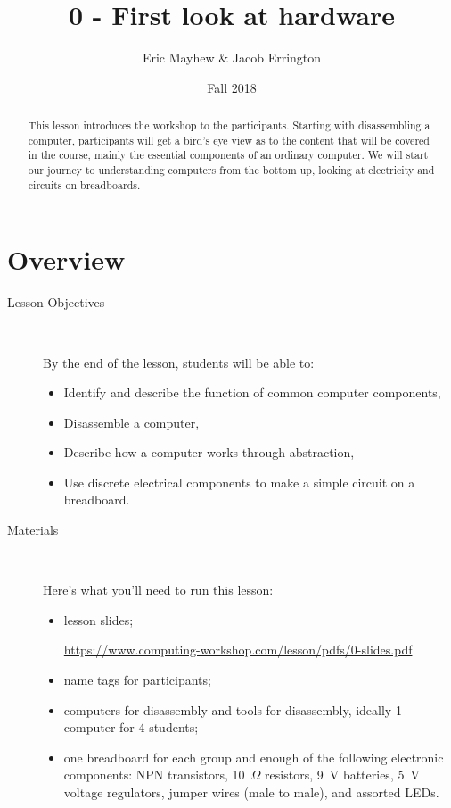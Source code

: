 \documentclass[11pt]{article}
\title{0 - First look at hardware}
\author{Eric Mayhew \& Jacob Errington}
\date{Fall 2018}
\newcommand{\cwurl}{https://www.computing-workshop.com/lesson/pdfs/}
\begin{document}
\renewcommand{\abstractname}{\vspace{-\baselineskip}}
\maketitle
\begin{abstract}
  This lesson introduces the workshop to the participants. Starting with
  disassembling a computer, participants will get a bird's eye view as to the
  content that will be covered in the course, mainly the essential components of
  an ordinary computer. We will start our journey to understanding computers
  from the bottom up, looking at electricity and circuits on breadboards.
\end{abstract}
\section*{Overview}
\begin{description}
  \item [Lesson Objectives]
    ~

   By the end of the lesson, students will be able to:
  \begin{itemize}

    \item Identify and describe the function of common computer components,

    \item Disassemble a computer,

    \item Describe how a computer works through abstraction,

    \item Use discrete electrical components to make a simple circuit on a breadboard.

  \end{itemize}
  \item [Materials]~

Here's what you'll need to run this lesson:
  \begin{itemize}
    \item
      lesson slides;

      \url{\cwurl 0-slides.pdf}

    \item
      name tags for participants;

    \item
      computers for disassembly and tools for disassembly, ideally 1
      computer for 4 students;

    \item
      one breadboard for each group and enough of the following electronic
      components:
      NPN transistors,
      10~$\Omega$ resistors,
      9~V batteries,
      5~V voltage regulators,
      jumper wires (male to male),
      and assorted LEDs.

  \end{itemize}
\end{description}
\end{document}

